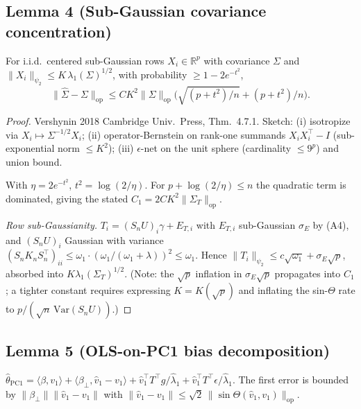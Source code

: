 \subsection*{Lemma 4 (Sub-Gaussian covariance concentration)}

\begin{lemma}\label{lem:vershynin}
For i.i.d.\ centered sub-Gaussian rows $X_i\in\mathbb{R}^p$ with covariance
$\Sigma$ and $\|X_i\|_{\psi_2}\le K\,\lambda_1(\Sigma)^{1/2}$, with probability
$\ge 1-2e^{-t^2}$,
\begin{equation}\label{eq:vershynin}
\|\widehat\Sigma-\Sigma\|_{\mathrm{op}}\le
C K^2\|\Sigma\|_{\mathrm{op}}\bigl(\sqrt{(p+t^2)/n}+(p+t^2)/n\bigr).
\end{equation}
\end{lemma}

\begin{proof}
Vershynin 2018 Cambridge Univ.\ Press, Thm.~4.7.1. Sketch: (i) isotropize via
$X_i\mapsto\Sigma^{-1/2}X_i$; (ii) operator-Bernstein on rank-one summands
$X_iX_i^\top-I$ (sub-exponential norm $\le K^2$); (iii) $\epsilon$-net on the
unit sphere (cardinality $\le 9^p$) and union bound.

With $\eta=2e^{-t^2}$, $t^2=\log(2/\eta)$. For $p+\log(2/\eta)\le n$ the
quadratic term is dominated, giving the stated $C_1=2CK^2\|\Sigma_T\|_{\mathrm{op}}$.

\emph{Row sub-Gaussianity.} $T_i=(S_nU)_i\gamma+E_{T,i}$ with $E_{T,i}$
sub-Gaussian $\sigma_E$ by (A4), and $(S_nU)_i$ Gaussian with variance
$(S_nK_nS_n^\top)_{ii}\le\omega_1\cdot(\omega_1/(\omega_1+\lambda))^2\le\omega_1$.
Hence $\|T_i\|_{\psi_2}\le c\sqrt{\omega_1}+\sigma_E\sqrt p$, absorbed into
$K\lambda_1(\Sigma_T)^{1/2}$. (Note: the $\sqrt p$ inflation in $\sigma_E\sqrt p$
propagates into $C_1$; a tighter constant requires expressing $K=K(\sqrt p)$
and inflating the sin-$\Theta$ rate to $p/(\sqrt n\,\mathrm{Var}(S_nU))$.)
\end{proof}

\subsection*{Lemma 5 (OLS-on-PC1 bias decomposition)}

\begin{lemma}\label{lem:pc1-bias}
$\widehat\theta_{\mathrm{PC1}}=\langle\beta,v_1\rangle+\langle\beta_\perp,\widehat v_1-v_1\rangle
+\widehat v_1^\top T^\top g/\widehat\lambda_1+\widehat v_1^\top T^\top\epsilon/\widehat\lambda_1.$
The first error is bounded by $\|\beta_\perp\|\|\widehat v_1-v_1\|$ with
$\|\widehat v_1-v_1\|\le\sqrt 2\,\|\sin\Theta(\widehat v_1,v_1)\|_{\mathrm{op}}$.
\end{lemma}

